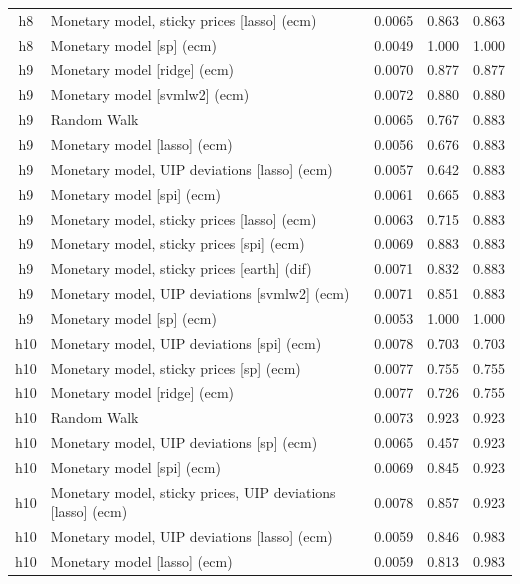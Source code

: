 \begin{ThreePartTable}
\begin{longtable}[t]{cp{5.5cm}ccc}
h8 & \raggedright Monetary model, sticky prices [lasso] (ecm) & 0.0065 & 0.863 & 0.863\\
h8 & \raggedright Monetary model [sp] (ecm) & 0.0049 & 1.000 & 1.000\\
\addlinespace
h9 & \raggedright Monetary model [ridge] (ecm) & 0.0070 & 0.877 & 0.877\\
h9 & \raggedright Monetary model [svmlw2] (ecm) & 0.0072 & 0.880 & 0.880\\
h9 & \raggedright Random Walk & 0.0065 & 0.767 & 0.883\\
h9 & \raggedright Monetary model [lasso] (ecm) & 0.0056 & 0.676 & 0.883\\
h9 & \raggedright Monetary model, UIP deviations [lasso] (ecm) & 0.0057 & 0.642 & 0.883\\
h9 & \raggedright Monetary model [spi] (ecm) & 0.0061 & 0.665 & 0.883\\
h9 & \raggedright Monetary model, sticky prices [lasso] (ecm) & 0.0063 & 0.715 & 0.883\\
h9 & \raggedright Monetary model, sticky prices [spi] (ecm) & 0.0069 & 0.883 & 0.883\\
h9 & \raggedright Monetary model, sticky prices [earth] (dif) & 0.0071 & 0.832 & 0.883\\
h9 & \raggedright Monetary model, UIP deviations [svmlw2] (ecm) & 0.0071 & 0.851 & 0.883\\
h9 & \raggedright Monetary model [sp] (ecm) & 0.0053 & 1.000 & 1.000\\
\addlinespace
h10 & \raggedright Monetary model, UIP deviations [spi] (ecm) & 0.0078 & 0.703 & 0.703\\
h10 & \raggedright Monetary model, sticky prices [sp] (ecm) & 0.0077 & 0.755 & 0.755\\
h10 & \raggedright Monetary model [ridge] (ecm) & 0.0077 & 0.726 & 0.755\\
h10 & \raggedright Random Walk & 0.0073 & 0.923 & 0.923\\
h10 & \raggedright Monetary model, UIP deviations [sp] (ecm) & 0.0065 & 0.457 & 0.923\\
h10 & \raggedright Monetary model [spi] (ecm) & 0.0069 & 0.845 & 0.923\\
h10 & \raggedright Monetary model, sticky prices, UIP deviations [lasso] (ecm) & 0.0078 & 0.857 & 0.923\\
h10 & \raggedright Monetary model, UIP deviations [lasso] (ecm) & 0.0059 & 0.846 & 0.983\\
h10 & \raggedright Monetary model [lasso] (ecm) & 0.0059 & 0.813 & 0.983\\

\end{longtable}
\end{ThreePartTable}
